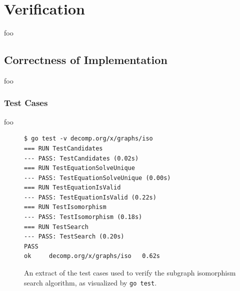 
\section{Verification}
\label{sec:verification}


foo


\subsection{Correctness of Implementation}


foo

\subsubsection{Test Cases}





foo

\begin{figure}[htbp]
	\begin{center}
		\begin{verbatim}
$ go test -v decomp.org/x/graphs/iso
=== RUN TestCandidates
--- PASS: TestCandidates (0.02s)
=== RUN TestEquationSolveUnique
--- PASS: TestEquationSolveUnique (0.00s)
=== RUN TestEquationIsValid
--- PASS: TestEquationIsValid (0.22s)
=== RUN TestIsomorphism
--- PASS: TestIsomorphism (0.18s)
=== RUN TestSearch
--- PASS: TestSearch (0.20s)
PASS
ok     decomp.org/x/graphs/iso   0.62s
		\end{verbatim}
		\caption{An extract of the test cases used to verify the subgraph isomorphism search algorithm, as visualized by \texttt{go test}.}
		\label{fig:iso_test_cases}
	\end{center}
\end{figure}

